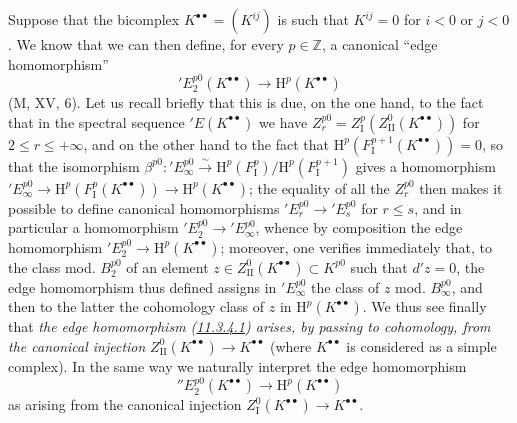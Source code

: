 \begin{env}[11.3.4]
\label{0.11.3.4}
Suppose that the bicomplex $K^{\bullet\bullet}=(K^{ij})$ is such that
$K^{ij}=0$ for $i<0$ or $j<0$. We know that we can then define, for every
$p\in\mathbb Z$, a canonical ``edge homomorphism''
\[
\label{0.11.3.4.1}
  'E_2^{p0}(K^{\bullet\bullet})\longrightarrow
  \mathrm H^p(K^{\bullet\bullet})
  \tag{11.3.4.1}
\]
(M, XV, 6). Let us recall briefly that this is due, on the one hand, to the fact
that in the spectral sequence $'E(K^{\bullet\bullet})$ we have
$Z_r^{p0}=Z_{\mathrm I}^p(Z_{\mathrm{II}}^0(K^{\bullet\bullet}))$ for
$2\leq r\leq+\infty$, and on the other hand to the fact that
$\mathrm H^p(F_{\mathrm I}^{p+1}(K^{\bullet\bullet}))=0$, so that
the isomorphism
$\beta^{p0}:'E_\infty^{p0}\xrightarrow{\sim}
\mathrm H^p(F_{\mathrm I}^p)/\mathrm H^p(F_{\mathrm I}^{p+1})$ gives a
homomorphism
$'E_\infty^{p0}\to\mathrm H^p(F_{\mathrm I}^p(K^{\bullet\bullet}))
\to\mathrm H^p(K^{\bullet\bullet})$; the equality of all the $Z_r^{p0}$ then
makes it possible to define canonical homomorphisms
$'E_r^{p0}\to'E_s^{p0}$ for $r\leq s$, and in particular a homomorphism
$'E_2^{p0}\to'E_\infty^{p0}$, whence by composition the edge homomorphism
$'E_2^{p0}\to\mathrm H^p(K^{\bullet\bullet})$; moreover, one verifies immediately
that, to the class mod. $B_2^{p0}$ of an element
$z\in Z_{\mathrm{II}}^0(K^{\bullet\bullet})\subset K^{p0}$ such that $d'z=0$,
the edge homomorphism thus defined assigns in $'E_\infty^{p0}$ the
class of $z$ mod. $B_\infty^{p0}$, and then to the latter the cohomology
class of $z$ in $\mathrm H^p(K^{\bullet\bullet})$. We thus see
finally that \emph{the edge homomorphism
(\hyperref[0.11.3.4.1]{11.3.4.1}) arises, by passing to cohomology,
from the canonical injection}
$Z_{\mathrm{II}}^0(K^{\bullet\bullet})\to K^{\bullet\bullet}$ (where
$K^{\bullet\bullet}$ is considered as a simple complex). In the same way we
naturally interpret the edge homomorphism
\[
\label{0.11.3.4.2}
  ''E_2^{p0}(K^{\bullet\bullet})\longrightarrow
  \mathrm H^p(K^{\bullet\bullet})
  \tag{11.3.4.2}
\]
as arising from the canonical injection
$Z_{\mathrm I}^0(K^{\bullet\bullet})\to K^{\bullet\bullet}$.
\end{env}

